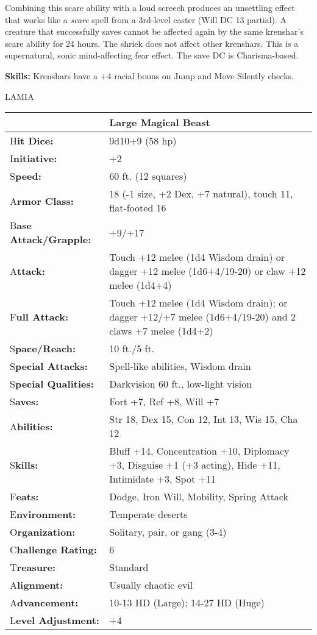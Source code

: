 \documentclass{article}
\begin{document}
Combining this scare ability with a loud screech produces an unsettling effect 
that works like a \textit{scare }spell from a 3rd-level caster (Will DC 13 partial). 
A creature that successfully saves cannot be affected again by the same krenshar's 
scare ability for 24 hours. The shriek does not affect other krenshars. This is 
a supernatural, sonic mind-affecting fear effect. The save DC is Charisma-based.

\textbf{Skills:} Krenshars have a +4 racial bonus on Jump and Move Silently checks.

\vspace{12pt}
{\LARGE{}LAMIA}

\begin{tabular}{|>{\raggedright}p{91pt}|>{\raggedright}p{233pt}|}
\hline
  & Large Magical Beast\tabularnewline
\hline
H\textbf{it Dice:} & 9d10+9 (58 hp)\tabularnewline
\hline
I\textbf{nitiative:} & +2\tabularnewline
\hline
S\textbf{peed:} & 60 ft. (12 squares)\tabularnewline
\hline
A\textbf{rmor Class:} & 18 (-1 size, +2 Dex, +7 natural), touch 11, flat-footed 
16\tabularnewline
\hline
B\textbf{ase Attack/Grapple:} & +9/+17\tabularnewline
\hline
A\textbf{ttack:} & Touch +12 melee (1d4 Wisdom drain) or dagger +12 melee (1d6+4/19-20) 
or claw +12 melee (1d4+4)\tabularnewline
\hline
F\textbf{ull Attack:} & Touch +12 melee (1d4 Wisdom drain); or dagger +12/+7 melee 
(1d6+4/19-20) and 2 claws +7 melee (1d4+2)\tabularnewline
\hline
S\textbf{pace/Reach:} & 10 ft./5 ft.\tabularnewline
\hline
S\textbf{pecial Attacks:} & Spell-like abilities, Wisdom drain\tabularnewline
\hline
S\textbf{pecial Qualities:} & Darkvision 60 ft., low-light vision\tabularnewline
\hline
S\textbf{aves:} & Fort +7, Ref +8, Will +7\tabularnewline
\hline
A\textbf{bilities:} & Str 18, Dex 15, Con 12, Int 13, Wis 15, Cha 12\tabularnewline
\hline
S\textbf{kills:} & Bluff +14, Concentration +10, Diplomacy +3, Disguise +1 (+3 
acting), Hide +11, Intimidate +3, Spot +11\tabularnewline
\hline
F\textbf{eats:} & Dodge, Iron Will, Mobility, Spring Attack\tabularnewline
\hline
E\textbf{nvironment:} & Temperate deserts\tabularnewline
\hline
O\textbf{rganization:} & Solitary, pair, or gang (3-4)\tabularnewline
\hline
C\textbf{hallenge Rating:} & 6\tabularnewline
\hline
T\textbf{reasure:} & Standard\tabularnewline
\hline
A\textbf{lignment:} & Usually chaotic evil \tabularnewline
\hline
A\textbf{dvancement:} & 10-13 HD (Large); 14-27 HD (Huge)\tabularnewline
\hline
L\textbf{evel Adjustment:} & +4\tabularnewline
\hline
\end{tabular}
\end{document}
